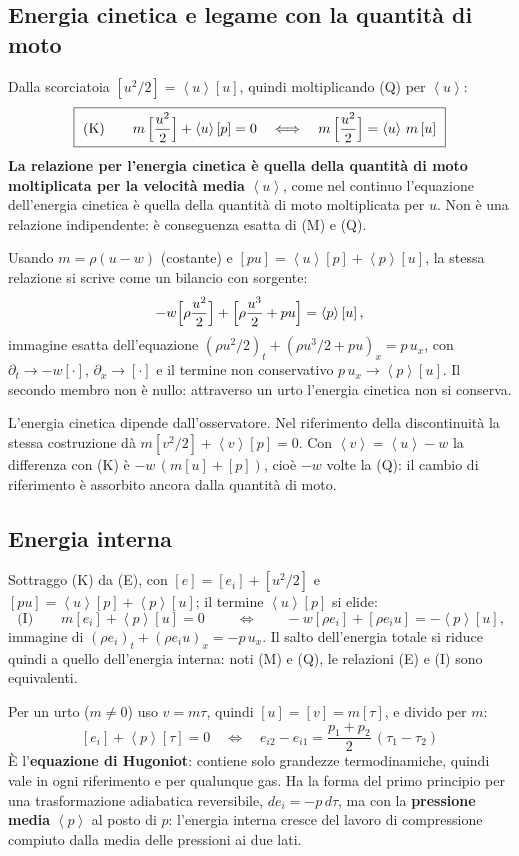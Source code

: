 \documentclass[11pt,a4paper]{article}
\newcommand{\jp}[1]{\left[#1\right]}            %
\newcommand{\av}[1]{\left\langle #1\right\rangle} %
\begin{document}
\subsection{Energia cinetica e legame con la quantità di moto}
Dalla scorciatoia $\jp{u^2/2}=\av{u}\jp{u}$, quindi moltiplicando (Q) per $\av{u}$:
\[
  \boxed{\ \text{(K)}\qquad m\,\Bigl[\frac{u^2}{2}\Bigr]+\av{u}\jp{p}=0
  \quad\Longleftrightarrow\quad
  m\,\Bigl[\frac{u^2}{2}\Bigr]=\av{u}\,m\jp{u}\ }
\]
\textbf{La relazione per l'energia cinetica è quella della quantità di moto moltiplicata per la velocità media}
$\av{u}$, come nel continuo l'equazione dell'energia cinetica è quella della quantità di moto moltiplicata per
$u$. Non è una relazione indipendente: è conseguenza esatta di (M) e (Q).

Usando $m=\rho(u-w)$ (costante) e $\jp{pu}=\av{u}\jp{p}+\av{p}\jp{u}$, la stessa relazione si scrive come un
bilancio con sorgente:
\[
  -w\Bigl[\rho\frac{u^2}{2}\Bigr]+\Bigl[\rho\frac{u^3}{2}+pu\Bigr]=\av{p}\jp{u},
\]
immagine esatta dell'equazione $(\rho u^2/2)_t+(\rho u^3/2+pu)_x=p\,u_x$, con $\partial_t\to-w\jp{\cdot}$,
$\partial_x\to\jp{\cdot}$ e il termine non conservativo $p\,u_x\to\av{p}\jp{u}$. Il secondo membro non è nullo:
attraverso un urto l'energia cinetica non si conserva.

L'energia cinetica dipende dall'osservatore. Nel riferimento della discontinuità la stessa costruzione dà
$m\jp{v^2/2}+\av{v}\jp{p}=0$. Con $\av{v}=\av{u}-w$ la differenza con (K) è $-w\,(m\jp{u}+\jp{p})$, cioè $-w$
volte la (Q): il cambio di riferimento è assorbito ancora dalla quantità di moto.

\subsection{Energia interna}
Sottraggo (K) da (E), con $\jp{e}=\jp{e_i}+\jp{u^2/2}$ e $\jp{pu}=\av{u}\jp{p}+\av{p}\jp{u}$; il termine
$\av{u}\jp{p}$ si elide:
\[
  \boxed{\ \text{(I)}\qquad m\jp{e_i}+\av{p}\jp{u}=0\ }
  \qquad\Longleftrightarrow\qquad
  -w\jp{\rho e_i}+\jp{\rho e_iu}=-\av{p}\jp{u},
\]
immagine di $(\rho e_i)_t+(\rho e_iu)_x=-p\,u_x$. Il salto dell'energia totale si riduce quindi a quello
dell'energia interna: noti (M) e (Q), le relazioni (E) e (I) sono equivalenti.

Per un urto ($m\neq0$) uso $v=m\tau$, quindi $\jp{u}=\jp{v}=m\jp{\tau}$, e divido per $m$:
\[
  \boxed{\ \jp{e_i}+\av{p}\jp{\tau}=0\quad\Longleftrightarrow\quad
  e_{i2}-e_{i1}=\frac{p_1+p_2}{2}\,(\tau_1-\tau_2)\ }
\]
È l'\textbf{equazione di Hugoniot}: contiene solo grandezze termodinamiche, quindi vale in ogni riferimento e per
qualunque gas. Ha la forma del primo principio per una trasformazione adiabatica reversibile,
$de_i=-p\,d\tau$, ma con la \textbf{pressione media} $\av{p}$ al posto di $p$: l'energia interna cresce del
lavoro di compressione compiuto dalla media delle pressioni ai due lati.
\end{document}
